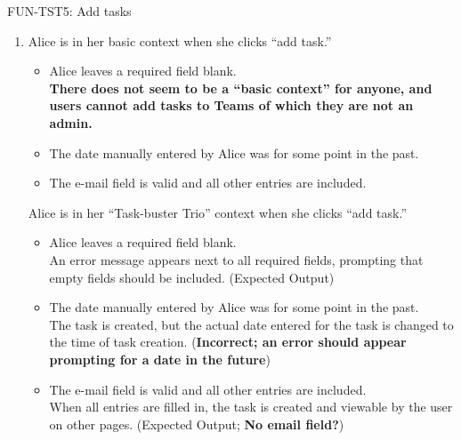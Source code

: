 \documentclass[12pt]{article}
\begin{document}
FUN-TST5: Add tasks
\begin{enumerate}
  \item Alice is in her basic context when she clicks ``add task.'' \\
  \begin{itemize}
    \item Alice leaves a required field blank. \\
        \textbf{There does not seem to be a ``basic context'' for anyone, and users cannot add tasks to Teams of which they are not an admin.}
    \item The date manually entered by Alice was for some point in the past.
    \item The e-mail field is valid and all other entries are included.
  \end{itemize}
  Alice is in her ``Task-buster Trio'' context when she clicks ``add task.''
  \begin{itemize}
    \item Alice leaves a required field blank. \\
        An error message appears next to all required fields, prompting that empty fields should be included.  (Expected Output)
    \item The date manually entered by Alice was for some point in the past. \\
        The task is created, but the actual date entered for the task is changed to the time of task creation.  (\textbf{Incorrect; an error should appear prompting for a date in the future})
    \item The e-mail field is valid and all other entries are included. \\
        When all entries are filled in, the task is created and viewable by the user on other pages.  (Expected Output; \textbf{No email field?})
  \end{itemize}
\end{enumerate}
\end{document}
